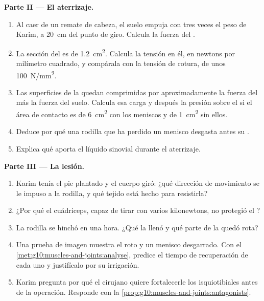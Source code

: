 \begin{problem}
\medskip
\noindent\textbf{Parte II --- El aterrizaje.}
\begin{enumerate}[resume]
  \item Al caer de un remate de cabeza, el suelo empuja con tres veces
        el peso de Karim, a \qty{20}{cm} del punto de giro. Calcula la
        fuerza del .
  \item La sección del  es de \qty{1.2}{cm^2}. Calcula la
        tensión en él, en newtons por milímetro cuadrado, y compárala
        con la tensión de rotura, de unos \qty{100}{N/mm^2}.
  \item Las superficies de la  quedan comprimidas por
        aproximadamente la fuerza del  más la fuerza del suelo.
        Calcula esa carga y después la presión sobre el  si el
        área de contacto es de \qty{6}{cm^2} con los meniscos y de
        \qty{1}{cm^2} sin ellos.
  \item Deduce por qué una rodilla que ha perdido un menisco desgasta
        antes su .
  \item Explica qué aporta el líquido sinovial durante el aterrizaje.
\end{enumerate}

\medskip
\noindent\textbf{Parte III --- La lesión.}
\begin{enumerate}[resume]
  \item Karim tenía el pie plantado y el cuerpo giró: ¿qué dirección de
        movimiento se le impuso a la rodilla, y qué tejido está hecho
        para resistirla?
  \item ¿Por qué el cuádriceps, capaz de tirar con varios kilonewtons,
        no protegió el ?
  \item La rodilla se hinchó en una hora. ¿Qué la llenó y qué parte de
        la  quedó rota?
  \item Una prueba de imagen muestra el  roto y un menisco
        desgarrado. Con el
        \cref{met:g10:muscles-and-joints:analyse}, predice el tiempo de
        recuperación de cada uno y justifícalo por su irrigación.
  \item Karim pregunta por qué el cirujano quiere fortalecerle los
        isquiotibiales antes de la operación. Responde con la
        \cref{prop:g10:muscles-and-joints:antagonists}.
\end{enumerate}


\end{problem}
